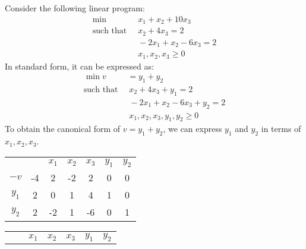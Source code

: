 \begin{example}
    Consider the following linear program: 
    \begin{align*}
        \min                      \:&\: x_1+x_2+10x_3           \\
        \text{such that }     &\: x_2+4x_3=2   \\
                                    &\: -2x_1+x_2-6x_3=2        \\
                                    &\: x_1,x_2,x_3 \geq 0
    \end{align*}
    In standard form, it can be expressed as:
    \begin{align*}
        \min                      v &=  y_1+y_2                 \\
        \text{such that }     &\: x_2+4x_3+y_1=2          \\
                                    &\: -2x_1+x_2-6x_3+y_2=2    \\
                                    &\: x_1,x_2,x_3,y_1,y_2     \geq 0
    \end{align*}
    To obtain the canonical form of $v=y_1+y_2$, we can express $y_1$ and $y_2$ in terms of $x_1,x_2,x_3$. 
    \begin{table}[H]
        \centering
        \begin{tabular}{ccccccc}
                                   &                         & $x_1$ & $x_2$ & $x_3$                   & $y_1$ & $y_2$                  \\ \cline{2-7} 
        \multicolumn{1}{c|}{$-v$}  & \multicolumn{1}{c|}{-4} & 2     & -2    & \multicolumn{1}{c|}{2}  & 0     & \multicolumn{1}{c|}{0} \\ \cline{2-7} 
        \multicolumn{1}{c|}{$y_1$} & \multicolumn{1}{c|}{2}  & 0     & 1     & \multicolumn{1}{c|}{4}  & 1     & \multicolumn{1}{c|}{0} \\
        \multicolumn{1}{c|}{$y_2$} & \multicolumn{1}{c|}{2}  & -2    & 1     & \multicolumn{1}{c|}{-6} & 0     & \multicolumn{1}{c|}{1} \\ \cline{2-7} 
        \end{tabular}
    \end{table}
    \begin{table}[H]
        \centering
        \begin{tabular}{ccccccc}
                                   &                        & $x_1$ & $x_2$ & $x_3$                    & $y_1$ & $y_2$                  \\ \cline{2-7} 

\end{tabular}
\end{table}
\end{example}
